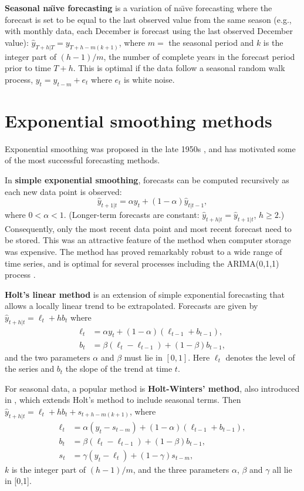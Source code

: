 \documentclass[a4paper,10pt]{article}
\begin{document}
\textbf{Seasonal na\"{\i}ve forecasting} is a variation of na\"{\i}ve forecasting where the forecast is set to be equal to the last observed value from the same season (e.g., with monthly data, each December is forecast using the last observed December value): $\hat{y}_{T+h|T}=y_{T+h-m(k+1)}$, where $m=$ the seasonal period and $k$ is the integer part of $(h-1)/m$, the number of complete years in the forecast period prior to time $T+h$. This is optimal if the data follow a seasonal random walk process, $y_t=y_{t-m}+e_t$ where $e_t$ is white noise.

\section{Exponential smoothing methods}

Exponential smoothing was proposed in the late 1950s \citep{Brown59,Holt57}, and has motivated some of the most successful forecasting methods.

In \textbf{simple exponential smoothing}, forecasts can be computed recursively as each new data point is observed:
\[
	\hat{y}_{t+1|t} = \alpha y_t + (1-\alpha)\hat{y}_{t|t-1},
\]
where $0<\alpha<1$. (Longer-term forecasts are constant: $\hat{y}_{t+h|t} = \hat{y}_{t+1|t}$, $h\ge2$.)
Consequently, only the most recent data point and most recent forecast need to be stored. This was an attractive feature of the method when computer storage was expensive. The method has proved remarkably robust to a wide range of time series, and is optimal for several processes including the ARIMA(0,1,1) process \citep{CKOS01}.

\textbf{Holt's linear method} \citep{Holt57} is an extension of simple exponential forecasting that allows a locally linear trend to be extrapolated. Forecasts are given by $\hat{y}_{t+h|t} = \ell_t + hb_t$ where
\begin{align*}
	\ell_t & = \alpha y_t + (1-\alpha)(\ell_{t-1} + b_{t-1}), \\
	b_t    & = \beta(\ell_t-\ell_{t-1}) + (1-\beta)b_{t-1},
\end{align*}
and the two parameters $\alpha$ and $\beta$ must lie in $[0,1]$. Here $\ell_t$ denotes the level of the series and $b_t$ the slope of the trend at time $t$.

For seasonal data, a popular method is \textbf{Holt-Winters' method}, also introduced in \citet{Holt57}, which extends Holt's method to include seasonal terms. Then $\hat{y}_{t+h|t} = \ell_t + hb_t + s_{t+h-m(k+1)}$, where
\begin{align*}
	\ell_t & = \alpha (y_t -s_{t-m}) + (1-\alpha)(\ell_{t-1} + b_{t-1}), \\
	b_t    & = \beta(\ell_t-\ell_{t-1}) + (1-\beta)b_{t-1},              \\
	s_t    & = \gamma(y_t-\ell_t)+(1-\gamma)s_{t-m},
\end{align*}
$k$ is the integer part of $(h-1)/m$, and the three parameters $\alpha$, $\beta$ and $\gamma$ all lie in [0,1].
\end{document}
